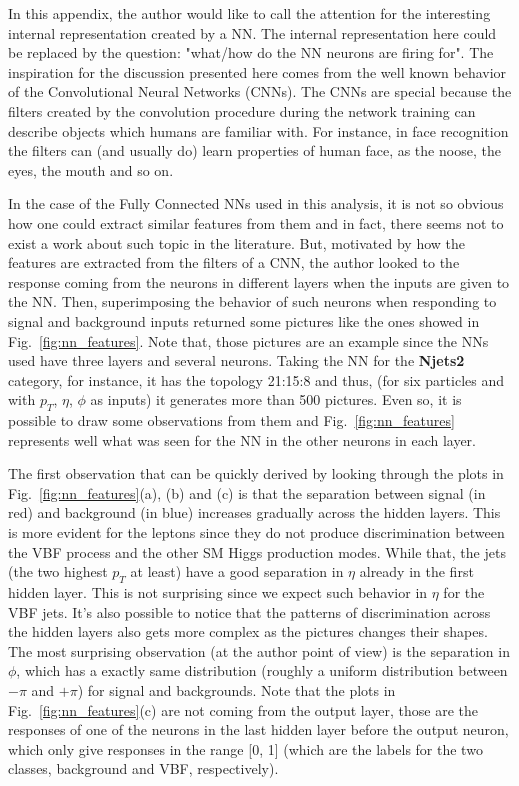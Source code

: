 In this appendix, the author would like to call the attention for the interesting internal representation created by a NN. The internal representation here could be replaced by the question: "what/how do the NN neurons are firing for". The inspiration for the discussion presented here comes from the well known behavior of the Convolutional Neural Networks (CNNs). The CNNs are special because the filters created by the convolution procedure during the network training can describe objects which humans are familiar with. For instance, in face recognition the filters can (and usually do) learn properties of human face, as the noose, the eyes, the mouth and so on.

In the case of the Fully Connected NNs used in this analysis, it is not so obvious how one could extract similar features from them and in fact, there seems not to exist a work about such topic in the literature. But, motivated by how the features are extracted from the filters of a CNN, the author looked to the response coming from the neurons in different layers when the inputs are given to the NN. Then, superimposing the behavior of such neurons when responding to signal and background inputs returned some pictures like the ones showed in Fig.~\ref{fig:nn_features}. Note that, those pictures are an example since the NNs used have three layers and several neurons. Taking the NN for the \textbf{Njets2} category, for instance, it has the topology 21:15:8 and thus, (for six particles and with $p_{T}$, $\eta$, $\phi$ as inputs) it generates more than 500 pictures. Even so, it is possible to draw some observations from them and Fig.~\ref{fig:nn_features} represents well what was seen for the NN in the other neurons in each layer.

The first observation that can be quickly derived by looking through the plots in Fig.~\ref{fig:nn_features}(a), (b) and (c) is that the separation between signal (in red) and background (in blue) increases gradually across the hidden layers. This is more evident for the leptons since they do not produce discrimination between the VBF process and the other SM Higgs production modes. While that, the jets (the two highest $p_{T}$ at least) have a good separation in $\eta$ already in the first hidden layer. This is not surprising since we expect such behavior in $\eta$ for the VBF jets. It's also possible to notice that the patterns of discrimination across the hidden layers also gets more complex as the pictures changes their shapes. The most surprising observation (at the author point of view) is the separation in $\phi$, which has a exactly same distribution (roughly a uniform distribution between $-\pi$ and $+\pi$) for signal and backgrounds. Note that the plots in Fig.~\ref{fig:nn_features}(c) are not coming from the output layer, those are the responses of one of the neurons in the last hidden layer before the output neuron, which only give responses in the range [0, 1] (which are the labels for the two classes, background and VBF, respectively).


